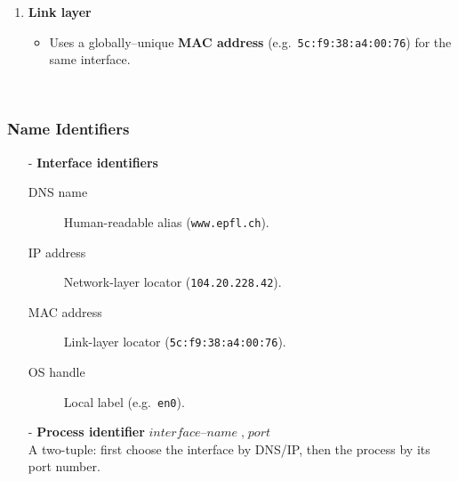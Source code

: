 \documentclass[../../compsys.tex]{subfiles}
\begin{document}
\begin{example}
\begin{minipage}[htp]{0.45\textwidth}
\begin{enumerate}
    \item \textbf{Link layer}  
          \begin{itemize}
            \item Uses a globally–unique \textbf{MAC address}
                  (e.g.\ \texttt{5c:f9:38:a4:00:76}) for the same
                  interface.
          \end{itemize}
  \end{enumerate}
  \end{minipage}\\
  \end{example}
  \subsubsection{Name Identifiers}\label{subsec:names}
  \begin{itemize}
    \item[-] \textbf{Interface identifiers}  
          \begin{description}
            \item[DNS name] Human-readable alias
                  (\texttt{www.epfl.ch}).
            \item[IP address] Network-layer locator
                  (\texttt{104.20.228.42}).
            \item[MAC address] Link-layer locator
                  (\texttt{5c:f9:38:a4:00:76}).
            \item[OS handle] Local label (e.g.\ \texttt{en0}).
          \end{description}
    \item[-] \textbf{Process identifier} $
            \textit{interface–name} \; , \; \textit{port}
          $\\
          A two-tuple: first choose the interface by DNS/IP, then the
          process by its port number.
\end{itemize}
  

  
\end{document}
